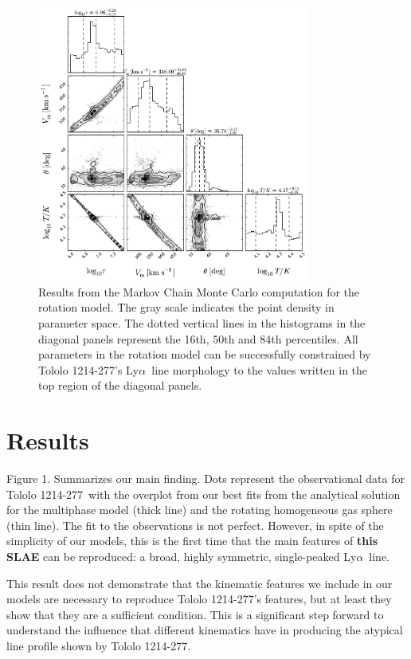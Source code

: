 \documentclass[a4paper,fleqn,usenatbib]{mnras}
\newcommand{\tol}{Tololo 1214-277}
\newcommand{\lya}{\ifmmode{{\rm Ly}\alpha}\else Ly$\alpha$\ \fi}
\begin{document}
\begin{figure}
\begin{center}
\includegraphics[width=0.8\textwidth]{emcee_results.pdf}
\caption{Results from the Markov Chain Monte Carlo computation for
    the rotation model. 
    The gray scale indicates the point density in parameter space. 
    The dotted vertical lines in the histograms in the diagonal panels
    represent the 16th, 50th and 84th percentiles. 
    All parameters in the rotation model can be successfully constrained by \tol's
    \lya line morphology to the values written in the top region of
    the diagonal panels.
    \label{emceeresults}} 
\end{center}
\end{figure}


\section{Results}


Figure 1. Summarizes our main finding.
Dots represent the observational data for \tol\ with the
overplot from our best fits from the analytical solution for the
multiphase model (thick line)  and the rotating homogeneous gas sphere
(thin line). 
The fit to the observations is not perfect. 
However, in spite of the
simplicity of our models, this is the first time that the main
features of {\bf this SLAE} can be reproduced: a broad, highly symmetric,
single-peaked \lya line. 

This result does not demonstrate that the kinematic features we
include in our models are necessary to reproduce \tol's features, but
at least they show that they are a sufficient condition.
This is a significant step forward to understand the influence that
different kinematics have in producing the atypical line profile shown
by \tol.
\end{document}
